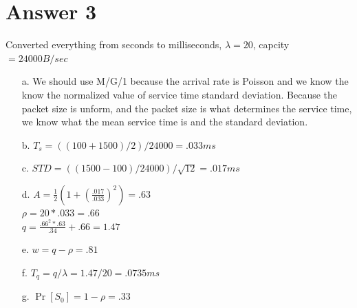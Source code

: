 \documentclass[11pt]{article}
\theoremstyle{definition}
\begin{document}
\section*{Answer 3}
Converted everything from seconds to milliseconds, $\lambda = 20$, capcity $= 24000B/sec$
\begin{enumerate}
	\item[a.] We should use M/G/1 because the arrival rate is Poisson and we know the know the normalized value of service time standard deviation. Because the packet
	size is unform, and the packet size is what determines the service time, we know what the mean service time is and the standard deviation.
	
	\item[b.] $T_s = ((100 + 1500) / 2) / 24000 = .033 ms$
	\item[c.] $STD = ((1500 - 100) / 24000) / \sqrt{12} = .017ms$\\
	\item[d.] $A = \frac{1}{2}(1 + (\frac{.017}{.033})^2) = .63$\\
	$\rho = 20 * .033 = .66$\\
	$q = \frac{.66^2 * .63}{.34} + .66 = 1.47$
	
	\item[e.] $w = q - \rho = .81$
	\item[f.] $T_q = q / \lambda = 1.47 / 20 = .0735ms$
	\item[g.] $\Pr[S_0] = 1 - \rho = .33$
\end{enumerate}
\end{document}
